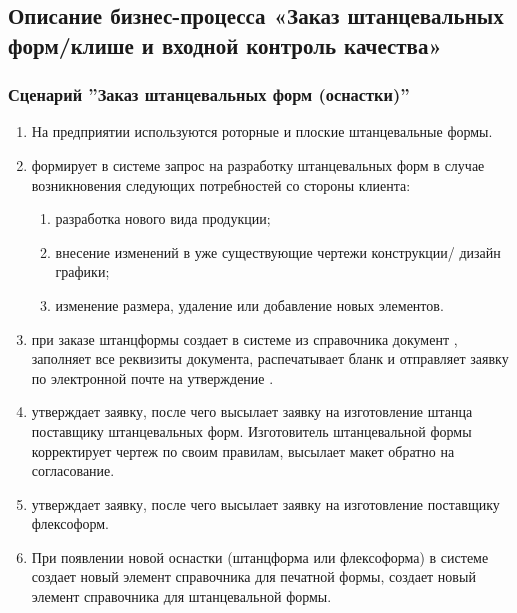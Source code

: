 \subsection{Описание бизнес-процесса «Заказ штанцевальных форм/клише и входной контроль качества»}
\label{bp:toolrequest}

\subsubsection{Сценарий ''Заказ штанцевальных форм  (оснастки)''}
\label{bp:toolrequest_1}

\begin{enumerate}

\item На предприятии используются роторные и плоские штанцевальные формы.
\item \tehnolog	 формирует в системе \gofro запрос на разработку штанцевальных форм в случае возникновения следующих потребностей со стороны клиента:
\begin{enumerate}
\item   	разработка нового вида продукции;
\item   	внесение изменений в уже существующие чертежи конструкции/ дизайн графики;
\item   	изменение размера, удаление или добавление новых элементов.
\end{enumerate}

\item \tehnolog	при заказе штанцформы  создает в системе \gofro из справочника  документ , \tehnolog заполняет все реквизиты документа, распечатывает бланк и отправляет заявку по электронной почте на утверждение \director.


\item  \director утверждает заявку, после чего \tehnolog высылает заявку на изготовление штанца поставщику штанцевальных форм. Изготовитель штанцевальной формы корректирует чертеж по своим правилам, высылает макет обратно на согласование. 
\item \director утверждает заявку, после чего  \tehnolog высылает заявку на изготовление  поставщику флексоформ.
\item	При появлении новой оснастки (штанцформа или флексоформа)  в системе \gofro \tehnolog создает новый элемент справочника  для печатной формы, \tehnolog создает новый элемент справочника  для штанцевальной формы.

\end{enumerate}


